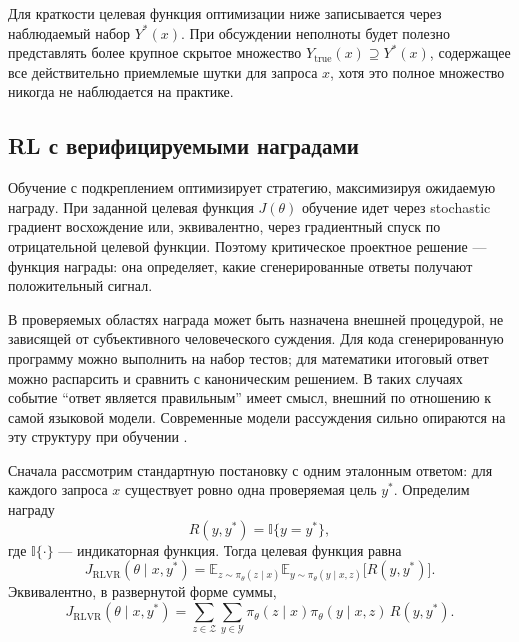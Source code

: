 Для краткости целевая функция оптимизации ниже записывается через наблюдаемый набор \(Y^{*}(x)\). При обсуждении неполноты будет полезно представлять более крупное скрытое множество \(Y_{\mathrm{true}}(x)\supseteq Y^{*}(x)\), содержащее все действительно приемлемые шутки для запроса \(x\), хотя это полное множество никогда не наблюдается на практике.

\subsection{RL с верифицируемыми наградами}

Обучение с подкреплением оптимизирует стратегию, максимизируя ожидаемую награду. При заданной целевая функция \(J(\theta)\) обучение идет через stochastic градиент восхождение или, эквивалентно, через градиентный спуск по отрицательной целевой функции. Поэтому критическое проектное решение --- функция награды: она определяет, какие сгенерированные ответы получают положительный сигнал.

В проверяемых областях награда может быть назначена внешней процедурой, не зависящей от субъективного человеческого суждения. Для кода сгенерированную программу можно выполнить на набор тестов; для математики итоговый ответ можно распарсить и сравнить с каноническим решением. В таких случаях событие ``ответ является правильным'' имеет смысл, внешний по отношению к самой языковой модели. Современные модели рассуждения сильно опираются на эту структуру при обучении \citep{DeepSeek2025,Lightman2023}.

Сначала рассмотрим стандартную постановку с одним эталонным ответом: для каждого запроса \(x\) существует ровно одна проверяемая цель \(y^{*}\). Определим награду
\[
 R(y,y^{*})=\mathbb{I}\{y=y^{*}\},
\]
где \(\mathbb{I}\{\cdot\}\) --- индикаторная функция. Тогда целевая функция равна
\[
 J_{\mathrm{RLVR}}(\theta\mid x,y^{*})
 =
 \mathbb{E}_{z\sim\pi_{\theta}(z\mid x)}
 \mathbb{E}_{y\sim\pi_{\theta}(y\mid x,z)}
 \big[R(y,y^{*})\big].
\]
Эквивалентно, в развернутой форме суммы,
\[
 J_{\mathrm{RLVR}}(\theta\mid x,y^{*})
 =
 \sum_{z\in\mathcal{Z}}\sum_{y\in\mathcal{Y}}
 \pi_{\theta}(z\mid x)\pi_{\theta}(y\mid x,z)\,R(y,y^{*}).
\]

